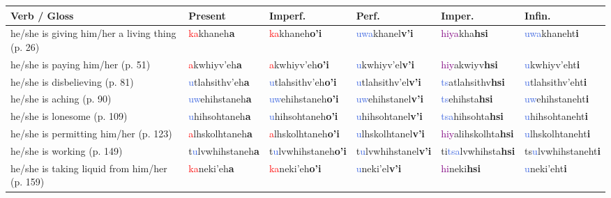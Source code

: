 \documentclass[oneside,openany]{book}%
\begin{document}
\begin{tabularx}{\textwidth}{>{\hsize=1.5\hsize\RaggedRight}X >{\hsize=0.9\hsize}X >{\hsize=0.9\hsize}X >{\hsize=0.9\hsize}X >{\hsize=0.9\hsize}X >{\hsize=0.9\hsize}X}%
\toprule%
\textbf{Verb / Gloss}&\textbf{Present}&\textbf{Imperf.}&\textbf{Perf.}&\textbf{Imper.}&\textbf{Infin.}\\%
\midrule%
he/she is giving him/her a living thing (p. 26)&\textcolor{Red}{ka}khaneh\textbf{a}&\textcolor{Red}{ka}khaneh\textbf{o'i}&\textcolor{RoyalBlue}{uwa}khanel\textbf{v'i}&\textcolor{Purple}{hiya}kha\textbf{hsi}&\textcolor{RoyalBlue}{uwa}khaneht\textbf{i}\\%
he/she is paying him/her (p. 51)&\textcolor{Red}{a}kwhiyv'eh\textbf{a}&\textcolor{Red}{a}kwhiyv'eh\textbf{o'i}&\textcolor{RoyalBlue}{u}kwhiyv'el\textbf{v'i}&\textcolor{Purple}{hiy}akwiyv\textbf{hsi}&\textcolor{RoyalBlue}{u}kwhiyv'eht\textbf{i}\\%
he/she is disbelieving (p. 81)&\textcolor{RoyalBlue}{u}tlahsithv'eh\textbf{a}&\textcolor{RoyalBlue}{u}tlahsithv'eh\textbf{o'i}&\textcolor{RoyalBlue}{u}tlahsithv'el\textbf{v'i}&\textcolor{RoyalBlue}{ts}atlahsithv\textbf{hsi}&\textcolor{RoyalBlue}{u}tlahsithv'eht\textbf{i}\\%
he/she is aching (p. 90)&\textcolor{RoyalBlue}{uw}ehihstaneh\textbf{a}&\textcolor{RoyalBlue}{uw}ehihstaneh\textbf{o'i}&\textcolor{RoyalBlue}{uw}ehihstanel\textbf{v'i}&\textcolor{RoyalBlue}{ts}ehihsta\textbf{hsi}&\textcolor{RoyalBlue}{uw}ehihstaneht\textbf{i}\\%
he/she is lonesome (p. 109)&\textcolor{RoyalBlue}{u}hihsohtaneh\textbf{a}&\textcolor{RoyalBlue}{u}hihsohtaneh\textbf{o'i}&\textcolor{RoyalBlue}{u}hihsohtanel\textbf{v'i}&\textcolor{RoyalBlue}{tsa}hihsohta\textbf{hsi}&\textcolor{RoyalBlue}{u}hihsohtaneht\textbf{i}\\%
he/she is permitting him/her (p. 123)&\textcolor{Red}{a}lhskolhtaneh\textbf{a}&\textcolor{Red}{a}lhskolhtaneh\textbf{o'i}&\textcolor{RoyalBlue}{u}lhskolhtanel\textbf{v'i}&\textcolor{Purple}{hiy}alihskolhta\textbf{hsi}&\textcolor{RoyalBlue}{u}lhskolhtaneht\textbf{i}\\%
he/she is working (p. 149)&t\textcolor{RoyalBlue}{u}lvwhihstaneh\textbf{a}&t\textcolor{RoyalBlue}{u}lvwhihstaneh\textbf{o'i}&t\textcolor{RoyalBlue}{u}lvwhihstanel\textbf{v'i}&ti\textcolor{RoyalBlue}{tsa}lvwhihsta\textbf{hsi}&ts\textcolor{RoyalBlue}{u}lvwhihstaneht\textbf{i}\\%
he/she is taking liquid from him/her (p. 159)&\textcolor{Red}{ka}neki'eh\textbf{a}&\textcolor{Red}{ka}neki'eh\textbf{o'i}&\textcolor{RoyalBlue}{u}neki'el\textbf{v'i}&\textcolor{Purple}{hi}neki\textbf{hsi}&\textcolor{RoyalBlue}{u}neki'eht\textbf{i}\\%

\end{tabularx}
\end{document}
